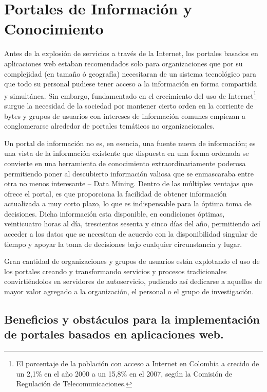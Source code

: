 \section{Portales de Información y Conocimiento}

Antes de la explosión de servicios a través de la Internet, los portales basados en aplicaciones web estaban recomendados solo para organizaciones que por su complejidad (en tamaño ó geografía) necesitaran de un sistema tecnológico para que todo su personal pudiese tener acceso a la información en forma compartida y simultánea. Sin embargo, fundamentado en el crecimiento del uso de Internet\footnote{El porcentaje de la población con acceso a Internet en Colombia a crecido de un 2,1\% en el año 2000 a un 15,8\% en el 2007, según la Comisión de Regulación de Telecomunicaciones.} surgue la necesidad de la sociedad por mantener cierto orden en la corriente de bytes y grupos de usuarios con intereses de información comunes empiezan a conglomerarse alrededor de portales temáticos no organizacionales.

Un portal de información no es, en esencia, una fuente nueva de información; es una vista de la información existente que dispuesta en una forma ordenada se convierte en una herramienta de conocimiento extraordinariamente poderosa permitiendo poner al descubierto información valiosa que se enmascaraba entre otra no menos interesante – Data Mining.
Dentro de las múltiples ventajas que ofrece el portal, es que proporciona la facilidad de obtener información actualizada a muy corto plazo, lo que es indispensable para la óptima toma de decisiones. Dicha información esta disponible, en condiciones óptimas,  veinticuatro horas al día, trescientos sesenta y cinco días del año, permitiendo así acceder a los datos que se necesitan de acuerdo con la disponibilidad singular de tiempo y apoyar la toma de decisiones bajo cualquier circunstancia y lugar.

Gran cantidad de organizaciones y grupos de usuarios están explotando el uso de los portales creando y transformando servicios y procesos tradicionales convirtiéndolos en servidores de autoservicio, pudiendo así dedicarse a aquellos de mayor valor agregado a la organización, el personal o el grupo de investigación. 

\subsection{Beneficios y obstáculos para la implementación de portales basados en aplicaciones web.}

